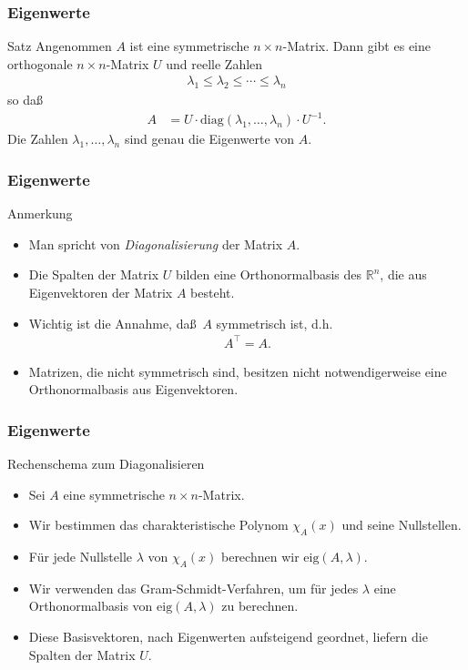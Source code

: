 \documentclass{beamer}
\renewcommand{\emph}[1]{{\textcolor{solarizedRed}{\itshape #1}}}
\newcommand\RR{\mathbb R}
\newcommand{\diag}{\mathrm{diag}}
\newcommand{\trans}{\top}
\newcommand{\ue}{\"u}
\newcommand{\eig}{\mathrm{eig}}
\newcommand{\mytitle}{Eigenwerte}
\begin{document}
\begin{frame}\frametitle{\mytitle}
	\begin{block}{Satz}
		Angenommen $A$ ist eine symmetrische $n\times n$-Matrix.
		Dann gibt es eine orthogonale $n\times n$-Matrix $U$ und reelle Zahlen
			\begin{align*}
			\lambda_1\leq\lambda_2\leq\cdots\leq\lambda_n
			\end{align*}
		so da\ss\
			\begin{align*}
				A&=U\cdot \diag(\lambda_1,\ldots,\lambda_n)\cdot U^{-1}.
			\end{align*}
		Die Zahlen $\lambda_1,\ldots,\lambda_n$ sind genau die Eigenwerte von $A$.
	\end{block}
\end{frame}

\begin{frame}\frametitle{\mytitle}
	\begin{block}{Anmerkung}
	\begin{itemize}
	\item Man spricht von \emph{Diagonalisierung} der Matrix $A$.
	\item Die Spalten der Matrix $U$ bilden eine Orthonormalbasis des $\RR^n$, die aus Eigenvektoren der Matrix $A$ besteht.
	\item Wichtig ist die Annahme, da\ss\ $A$ symmetrisch ist, d.h.\
		\begin{align*}
		A^\trans=A.
		\end{align*}
	\item Matrizen, die nicht symmetrisch sind, besitzen nicht notwendigerweise eine Orthonormalbasis aus Eigenvektoren.
	\end{itemize}
	\end{block}
\end{frame}

\begin{frame}\frametitle{\mytitle}
	\begin{block}{Rechenschema zum Diagonalisieren}
	\begin{itemize}
		\item Sei $A$ eine symmetrische $n\times n$-Matrix.
		\item Wir bestimmen das charakteristische Polynom $\chi_A(x)$ und seine Nullstellen.
		\item F\ue r jede Nullstelle $\lambda$ von $\chi_A(x)$ berechnen wir $\eig(A,\lambda)$.
		\item Wir verwenden das Gram-Schmidt-Verfahren, um f\ue r jedes $\lambda$ eine Orthonormalbasis von $\eig(A,\lambda)$ zu berechnen.
		\item Diese Basisvektoren, nach Eigenwerten aufsteigend geordnet, liefern die Spalten der Matrix $U$.
	\end{itemize}
	\end{block}
\end{frame}
\end{document}
